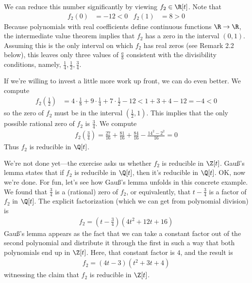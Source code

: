 {We can reduce this number significantly by viewing $f_{2} \in \R[t]$. Note that
\begin{align*}
f_{2}(0)
&=
-12
<
0
&
f_{2}(1)
&=
8
>
0
\end{align*}
Because polynomials with real coefficients define continuous functions $\R \rightarrow \R$, the intermediate value theorem implies that $f_{2}$ has a zero in the interval $(0,1)$. Assuming this is the only interval on which $f_{2}$ has real zeros (see Remark 2.2 below), this leaves only three values of $\frac{a}{b}$ consistent with the divisibility conditions, namely, $\frac{1}{4}, \frac{1}{2}, \frac{3}{4}$.

If we're willing to invest a little more work up front, we can do even better. We compute
\begin{align*}
f_{2}\left(\frac{1}{2}\right)
&=
4 \cdot \frac{1}{8} + 9 \cdot \frac{1}{4} + 7 \cdot \frac{1}{2} - 12
<
1 + 3 + 4 - 12
=
-4
<
0
\end{align*}
so the zero of $f_{2}$ must be in the interval $(\frac{1}{2}, 1)$. This implies that the only possible rational zero of $f_{2}$ is $\frac{3}{4}$. We compute
\begin{align*}
f_{2}\left(\frac{3}{4}\right)
=
\frac{27}{16} + \frac{81}{16} + \frac{84}{16} - \frac{14^{2} - 2^{2}}{16}
=
0
\end{align*}
Thus $f_{2}$ is reducible in $\Q[t]$.

We're not done yet---the exercise asks us whether $f_{2}$ is reducible in $\Z[t]$. Gau\ss{}'s lemma states that if $f_{2}$ is reducible in $\Q[t]$, then it's reducible in $\Q[t]$. OK, now we're done. For fun, let's see how Gau\ss{}'s lemma unfolds in this concrete example. We found that $\frac{3}{4}$ is a (rational) zero of $f_{2}$, or equivalently, that $t - \frac{3}{4}$ is a factor of $f_{2}$ in $\Q[t]$. The explicit factorization (which we can get from polynomial division) is
\begin{align*}
f_{2}
=
\left(t - \frac{3}{4}\right) \left(4 t^{2} + 12 t + 16\right)
\end{align*}
Gau\ss{}'s lemma appears as the fact that we can take a constant factor out of the second polynomial and distribute it through the first in such a way that both polynomials end up in $\Z[t]$. Here, that constant factor is $4$, and the result is
\begin{align*}
f_{2}
=
(4 t - 3) (t^{2} + 3 t + 4)
\end{align*}
witnessing the claim that $f_{2}$ is reducible in $\Z[t]$.

}
